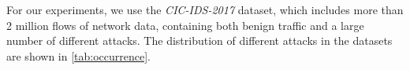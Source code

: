 \documentclass[conference]{IEEEtran}
\begin{document}

For our experiments, we use the \textit{CIC-IDS-2017} \cite{sharafaldin_toward_2018} dataset, which includes more than 2 million flows of network data, containing both benign traffic and a large number of different attacks. The distribution of different attacks in the datasets are shown in \autoref{tab:occurrence}.
\end{document}
